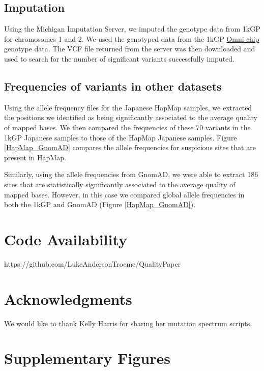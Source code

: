 \documentclass[9pt,lineno]{elife}
\begin{document}
\subsection{Imputation}
Using the Michigan Imputation Server, we imputed the genotype data from 1kGP for chromosomes 1 and 2.
We used the genotyped data from the 1kGP \href{ftp://ftp.1000genomes.ebi.ac.uk/vol1/ftp/release/20130502/supporting/hd_genotype_chip/ALL.chip.omni_broad_sanger_combined.20140818.snps.genotypes.vcf.gz}{Omni chip} genotype data.
The VCF file returned from the server was then downloaded and used to search for the number of significant variants successfully imputed. 

\subsection{Frequencies of variants in other datasets}
Using the allele frequency files for the Japanese HapMap samples, we extracted the positions we identified as being significantly associated to the average quality of mapped bases. We then compared the frequencies of these 70 variants in the 1kGP Japanese samples to those of the HapMap Japanese samples. Figure \ref{HapMap_GnomAD} compares the allele frequencies for suspicious sites that are present in HapMap.

Similarly, using the allele frequencies from GnomAD, we were able to extract 186 sites that are statistically significantly associated to the average quality of mapped bases. However, in this case we compared global allele frequencies in both the 1kGP and GnomAD (Figure \ref{HapMap_GnomAD}). 

\section{Code Availability}
https://github.com/LukeAndersonTrocme/QualityPaper

\section{Acknowledgments}
We would like to thank Kelly Harris for sharing her mutation spectrum scripts.



\clearpage
\section{Supplementary Figures}

\renewcommand{\thefigure}{S\arabic{figure}}
\setcounter{figure}{0}   	
\end{document}
